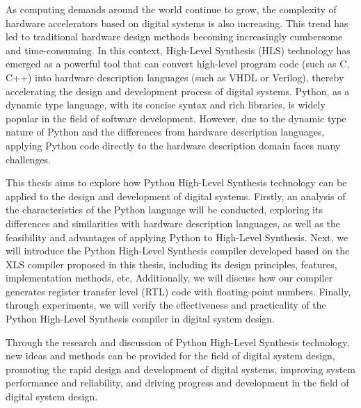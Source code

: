 \begin{enabstract}
As computing demands around the world continue to grow,
the complexity of hardware accelerators based on digital systems is also increasing.
This trend has led to traditional hardware design methods becoming increasingly cumbersome and time-consuming.
In this context, High-Level Synthesis (HLS) technology has emerged as a powerful tool 
that can convert high-level program code (such as C, C++) 
into hardware description languages (such as VHDL or Verilog), 
thereby accelerating the design and development process of digital systems. 
Python, as a dynamic type language, 
with its concise syntax and rich libraries, 
is widely popular in the field of software development. 
However, due to the dynamic type nature of Python 
and the differences from hardware description languages, 
applying Python code directly to the hardware description domain faces many challenges.

This thesis aims to explore how Python High-Level Synthesis technology 
can be applied to the design and development of digital systems. 
Firstly, an analysis of the characteristics of the Python language will be conducted, 
exploring its differences and similarities with hardware description languages, 
as well as the feasibility and advantages of applying Python to High-Level Synthesis. 
Next, we will introduce the Python High-Level Synthesis compiler developed 
based on the XLS compiler proposed in this thesis, 
including its design principles, features, implementation methods, etc,
Additionally, we will discuss how our compiler generates register transfer level (RTL) 
code with floating-point numbers.
Finally, through experiments, 
we will verify the effectiveness and practicality of the Python High-Level Synthesis 
compiler in digital system design.

Through the research and discussion of Python High-Level Synthesis technology, 
new ideas and methods can be provided for the field of digital system design, 
promoting the rapid design and development of digital systems, 
improving system performance and reliability, 
and driving progress and development in the field of digital system design.

\end{enabstract}